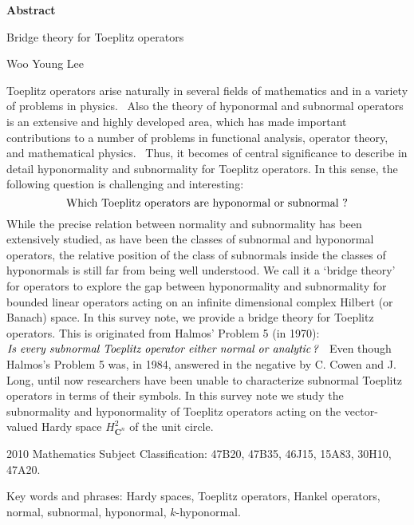 \documentclass[12pt,a4paper,2sided]{article}
\begin{document}
\newpage{}

 \vspace{0.5cm}

\centerline{\bf Abstract}

\vspace{.3 cm}

\centerline{\large Bridge theory for Toeplitz operators}

\vspace{.3 cm} \centerline{\sc Woo Young Lee}

\vspace{0.4 cm} Toeplitz operators arise naturally in several fields
of mathematics and in a variety of problems in physics. \ Also the
theory of hyponormal and subnormal operators is an extensive and
highly developed area, which has made important contributions to a
number of problems in functional analysis, operator theory, and
mathematical physics. \ Thus, it becomes of central significance to
describe in detail hyponormality and subnormality for Toeplitz
operators. In this sense, the following question is challenging and
interesting:
$$
\hbox{Which Toeplitz operators are hyponormal or subnormal ?}
$$
While the precise relation between normality and subnormality has
been extensively studied, as have been the classes of subnormal and
hyponormal operators, the relative position of the class of
subnormals inside the classes of hyponormals is still far from being
well understood. We call it a `bridge theory' for operators to
explore the gap between hyponormality and subnormality for bounded
linear operators acting on an infinite dimensional complex Hilbert
(or Banach) space. In this survey note, we provide a bridge theory
for Toeplitz operators. This is originated from Halmos' Problem 5
(in 1970): $\hbox{\it Is every subnormal Toeplitz operator either
normal or analytic\,?}$ \ Even though Halmos's Problem 5 was, in
1984, answered in the negative by C. Cowen and J. Long, until now
researchers have been unable to characterize subnormal Toeplitz
operators in terms of their symbols. In this survey note we study
the subnormality and hyponormality of Toeplitz operators acting on
the vector-valued Hardy space $H^2_{\mathbf{C}^n}$ of the unit
circle.

\vspace{.3 cm}

{\footnotesize 2010 Mathematics Subject Classification: 47B20,
47B35, 46J15, 15A83, 30H10, 47A20.

\vspace{.2 cm}

\indent Key words and phrases: Hardy spaces, Toeplitz operators,
Hankel operators, normal, subnormal, hyponormal, $k$-hyponormal. }
\end{document}
